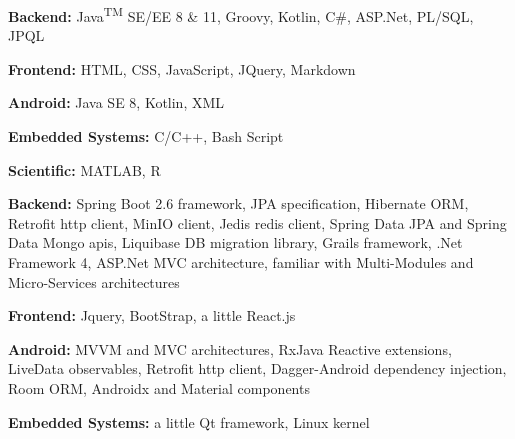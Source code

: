 

\begin{cvskills}

\cvskill
  {} %
  { %
    \begin{cvitems} %
      \item {\textbf{Backend:} Java\textsuperscript{TM} SE/EE 8 \& 11, Groovy, Kotlin, C\#, ASP.Net, PL/SQL, JPQL}
      \item {\textbf{Frontend:} HTML, CSS, JavaScript, JQuery, Markdown}
      \item {\textbf{Android:} Java SE 8, Kotlin, XML}
      \item {\textbf{Embedded Systems:} C/C++, Bash Script}
      \item {\textbf{Scientific:} MATLAB, R}
    \end{cvitems}
  } 
  
\cvskill
  {} %
  { %
    \begin{cvitems} %
      \item {\textbf{Backend:} Spring Boot 2.6 framework, JPA specification, Hibernate ORM, Retrofit http client, MinIO client, Jedis redis client, Spring Data JPA and Spring Data Mongo apis, Liquibase DB migration library, Grails framework, .Net Framework 4, ASP.Net MVC architecture, familiar with Multi-Modules and Micro-Services architectures}
      \item {\textbf{Frontend:} Jquery, BootStrap, a little React.js}
      \item {\textbf{Android:} MVVM and MVC architectures, RxJava Reactive extensions, LiveData observables, Retrofit http client, Dagger-Android dependency injection, Room ORM, Androidx and Material components}
      \item {\textbf{Embedded Systems:} a little Qt framework, Linux kernel}
    \end{cvitems}
  }


\end{cvskills}
